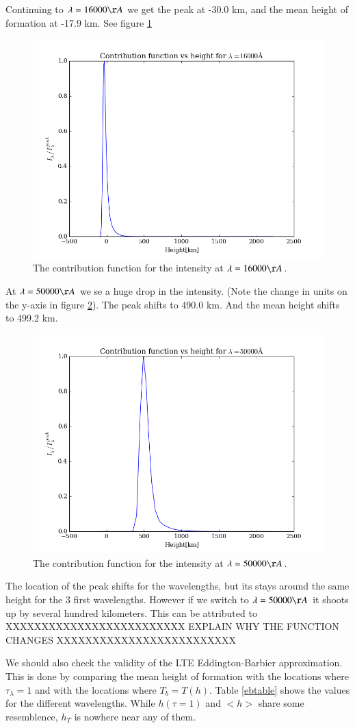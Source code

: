 \documentclass{aa}   %
\begin{document}
Continuing to $\lambda = 16000\AA$ we get the peak at -30.0 km, and the mean height of formation at -17.9 km. See figure \ref{contfunc_16000}

\begin{figure}
 \includegraphics[width=.49\textwidth]{contfunc_16000.png}
 \caption{The contribution function for the intensity at $\lambda= 16000\AA$.}
 \label{contfunc_16000}
\end{figure}

At $\lambda = 50000\AA$ we se a huge drop in the intensity. (Note the change in units on the y-axis in figure \ref{contfunc_50000}). The peak shifts to 490.0 km. And the mean height shifts to 499.2 km.

\begin{figure}
 \includegraphics[width=.49\textwidth]{contfunc_50000.png}
 \caption{The contribution function for the intensity at $\lambda= 50000\AA$.}
 \label{contfunc_50000}
\end{figure}


The location of the peak shifts for the wavelengths, but its stays around the same height for the 3 first wavelengths. However if we switch to $\lambda = 50000 \AA$ it shoots up by several hundred kilometers. This can be attributed to XXXXXXXXXXXXXXXXXXXXXXXXX EXPLAIN WHY THE FUNCTION CHANGES XXXXXXXXXXXXXXXXXXXXXXXXX

We should also check the validity of the LTE Eddington-Barbier approximation. This is done by comparing the mean height of formation with the locations where $\tau_\lambda = 1$ and with the locations where $T_b = T(h)$.
Table \ref{ebtable} shows the values for the different wavelengths. While $h(\tau=1)$ and $<h>$ share some resemblence, $h_T$ is nowhere near any of them.
\end{document}
